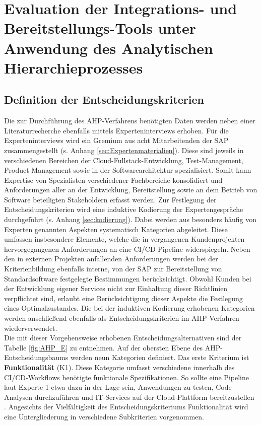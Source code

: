\section{Evaluation der Integrations- und Bereitstellungs-Tools unter Anwendung des Analytischen Hierarchieprozesses}
\label{sec:AHP}
\subsection{Definition der Entscheidungskriterien}
 Die zur Durchführung des AHP-Verfahrens benötigten Daten werden neben einer Literaturrecherche ebenfalls mittels Experteninterviews erhoben. Für die Experteninterviews wird ein Gremium aus acht Mitarbeitenden der SAP zusammengestellt (s. Anhang \ref{sec:Expertenmaterialien}). Diese sind jeweils in verschiedenen Bereichen der Cloud-Fullstack-Entwicklung, Test-Management, Product Management sowie in der Softwarearchitektur spezialisiert. Somit kann Expertise von Spezialisten verschiedener Fachbereiche konsolidiert und Anforderungen aller an der Entwicklung, Bereitstellung sowie an dem Betrieb von Software beteiligten Stakeholdern erfasst werden. Zur Festlegung der Entscheidungskriterien wird eine induktive Kodierung der Expertengespräche durchgeführt (s. Anhang \ref{sec:kodierung}). Dabei werden aus besonders häufig von Experten genannten Aspekten systematisch Kategorien abgeleitet. Diese umfassen insbesondere Elemente, welche die in vergangenen Kundenprojekten hervorgegangenen Anforderungen an eine CI/CD-Pipeline widerspiegeln. Neben den in externen Projekten anfallenden Anforderungen werden bei der Kriterienbildung ebenfalls interne, von der SAP zur Bereitstellung von Standardsoftware festgelegte Bestimmungen berücksichtigt. Obwohl Kunden bei der Entwicklung eigener Services nicht zur Einhaltung dieser Richtlinien verpflichtet sind, erlaubt eine Berücksichtigung dieser Aspekte die Festlegung eines Optimalzustandes. Die bei der induktiven Kodierung erhobenen Kategorien werden anschließend ebenfalls als Entscheidungskriterien im AHP-Verfahren wiederverwendet.\\ Die mit dieser Vorgehensweise erhobenen Entscheidungsalternativen sind der Tabelle \ref{fig:AHP_E} zu entnehmen. 
 Auf der obersten Ebene des AHP-Entscheidungsbaums werden neun Kategorien definiert. Das erste Kriterium ist \textbf{Funktionalität} (K1). Diese Kategorie umfasst verschiedene innerhalb des CI/CD-Workflows benötigte funktionale Spezifikationen. So sollte eine Pipeline laut Experte 1 etwa dazu in der Lage sein, Anwendungen zu testen, Code-Analysen durchzuführen und IT-Services auf der Cloud-Plattform bereitzustellen \cite[Z. 72 ff.]{ProductOwnerSAPBTPProd&Infra.}. Angesichts der Vielfältigkeit des Entscheidungskriteriums Funktionalität wird eine Untergliederung in verschiedene Subkriterien vorgenommen. 
